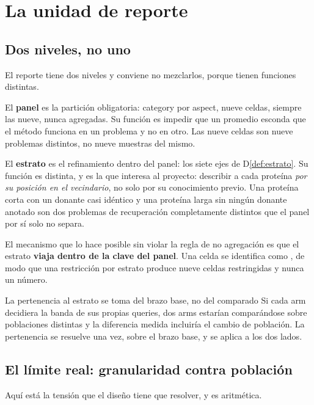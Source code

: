 \section{La unidad de reporte}
\label{sec:unidad-reporte}

\subsection{Dos niveles, no uno}

El reporte tiene dos niveles y conviene no mezclarlos, porque tienen funciones
distintas.

El \textbf{panel} es la partición obligatoria: category por aspect, nueve celdas,
siempre las nueve, nunca agregadas. Su función es impedir que un promedio esconda
que el método funciona en un problema y no en otro. Las nueve celdas son nueve
problemas distintos, no nueve muestras del mismo.

El \textbf{estrato} es el refinamiento dentro del panel: los siete ejes de
D\ref{def:estrato}. Su función es distinta, y es la que interesa al proyecto:
describir a cada proteína \emph{por su posición en el vecindario}, no solo por su
conocimiento previo. Una proteína corta con un donante casi idéntico y una
proteína larga sin ningún donante anotado son dos problemas de recuperación
completamente distintos que el panel por sí solo no separa.

El mecanismo que lo hace posible sin violar la regla de no agregación es que el
estrato \textbf{viaja dentro de la clave del panel}. Una celda se identifica como
, de modo que una restricción por estrato produce
nueve celdas restringidas y nunca un número.

\begin{aviso}{La pertenencia al estrato se toma del brazo base, no del comparado}
Si cada arm decidiera la banda de sus propias queries, dos arms estarían
comparándose sobre poblaciones distintas y la diferencia medida incluiría el
cambio de población. La pertenencia se resuelve una vez, sobre el brazo base, y se
aplica a los dos lados.
\end{aviso}

\subsection{El límite real: granularidad contra población}

Aquí está la tensión que el diseño tiene que resolver, y es aritmética.

